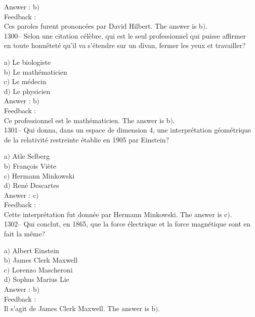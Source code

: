 ﻿\documentclass[letterpaper, 12pt]{article}
\begin{document}
Answer : b$)$\\

Feedback : \\
Ces paroles furent prononc\'ees par David Hilbert.
The answer is  b$)$.\\

1300-- Selon une citation c\'el\`ebre, qui est le seul professionnel
qui puisse affirmer en toute honn\^etet\'e qu'il va s'\'etendre sur
un divan, fermer les yeux et travailler?

a$)$ Le biologiste \\
b$)$ Le math\'ematicien \\
c$)$ Le m\'edecin \\
d$)$ Le physicien\\

Answer : b$)$\\

Feedback : \\
Ce professionnel est le math\'ematicien.
The answer is  b$)$.\\

1301-- Qui donna, dans un espace de dimension 4, une
interpr\'etation g\'eom\'etrique de la relativit\'e restreinte
\'etablie en 1905 par Einstein?

a$)$ Atle Selberg \\
b$)$ Fran\c cois Vi\`ete \\
c$)$ Hermann Minkowski \\
d$)$ Ren\'e Descartes\\

Answer : c$)$\\

Feedback : \\
Cette interpr\'etation fut donn\'ee par Hermann Minkowski.
The answer is  c$)$.\\

1302-- Qui conclut, en 1865, que la force \'electrique et la force
magn\'etique sont en fait la m\^eme?

a$)$ Albert Einstein \\
b$)$ James Clerk Maxwell \\
c$)$ Lorenzo Mascheroni\\
d$)$ Sophus Marius Lie\\

Answer : b$)$\\

Feedback : \\
Il s'agit de James Clerk Maxwell.
The answer is  b$)$.\\
\end{document}

